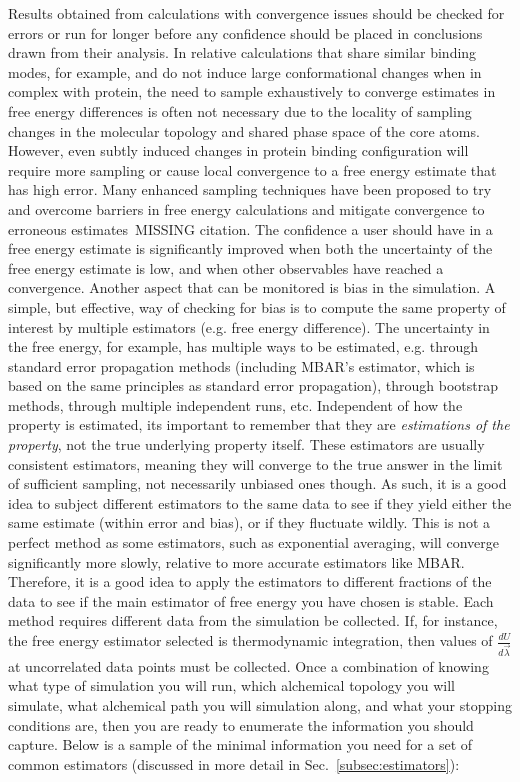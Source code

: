 \documentclass[9pt,bestpractices]{livecoms}
\begin{document}
Results obtained from calculations with convergence issues should be checked for errors or run for longer before any confidence should be placed in conclusions drawn from their analysis.
In relative calculations that share similar binding modes, for example, and do not induce large conformational changes when in complex with protein, the need to sample exhaustively to converge estimates in free energy differences is often not necessary due to the locality of sampling changes in the molecular topology and shared phase space of the core atoms.
However, even subtly induced changes in protein binding configuration will require more sampling or cause local convergence to a free energy estimate that has high error.
Many enhanced sampling techniques have been proposed to try and overcome barriers in free energy calculations and mitigate convergence to erroneous estimates~\cite{}MISSING citation. 
The confidence a user should have in a free energy estimate is significantly improved when both the uncertainty of the free energy estimate is low, and when other observables have reached a convergence.
%
Another aspect that can be monitored is bias in the simulation. A simple, but effective, way of checking for bias is to compute the same property of interest by multiple estimators (e.g. free energy difference). 
The uncertainty in the free energy, for example, has multiple ways to be estimated, e.g. through standard error propagation methods (including MBAR's estimator, which is based on the same principles as standard error propagation), through bootstrap methods, through multiple independent runs, etc. 
Independent of how the property is estimated, its important to remember that they are \textit{estimations of the property}, not the true underlying property itself. 
These estimators are usually consistent estimators, meaning they will converge to the true answer in the limit of sufficient sampling, not necessarily unbiased ones though.
As such, it is a good idea to subject different estimators to the same data to see if they yield either the same estimate (within error and bias), or if they fluctuate wildly. 
This is not a perfect method as some estimators, such as exponential averaging, will converge significantly more slowly, relative to more accurate estimators like MBAR. 
Therefore, it is a good idea to apply the estimators to different fractions of the data to see if the main estimator of free energy you have chosen is stable.
%
Each method requires different data from the simulation be collected.  If, for instance, the free energy estimator selected is thermodynamic integration, then values of $\frac{dU}{d\vec{\lambda}}$ at uncorrelated data points must be collected. Once a combination of knowing what type of simulation you will run, which alchemical topology you will simulate, what alchemical path you will simulation along, and what your stopping conditions are, then you are ready to enumerate the information you should capture. Below is a sample of the minimal information you need for a set of common estimators (discussed in more detail in Sec.~\ref{subsec:estimators}):
\end{document}
